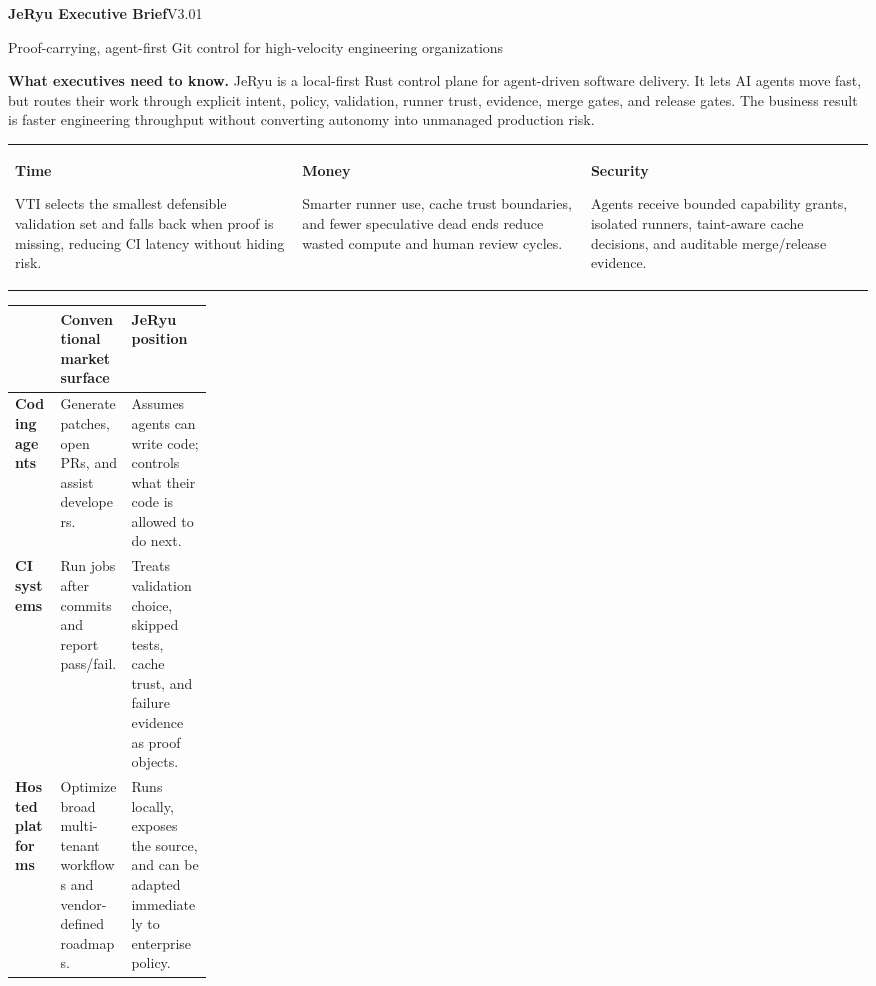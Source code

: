 \documentclass[10pt]{article}
\newcommand{\metricbox}[3]{%
\begin{tcolorbox}[enhanced,sharp corners,boxrule=0.45pt,colframe=#1!70!black,colback=#1!8,left=5pt,right=5pt,top=4pt,bottom=4pt,height=1.05in]
{\footnotesize\bfseries #2}\par
{\scriptsize #3}
\end{tcolorbox}}
\newcommand{\sectionlabel}[1]{\vspace{2pt}{\small\bfseries\color{navy}#1}\vspace{2pt}\par}
\begin{document}
{\LARGE\bfseries JeRyu Executive Brief}\hfill{\small V3.01}

{\large\color{navy}Proof-carrying, agent-first Git control for high-velocity engineering organizations}

\vspace{3pt}
\begin{tcolorbox}[enhanced,sharp corners,boxrule=0pt,colback=navy!7,left=7pt,right=7pt,top=6pt,bottom=6pt]
{\bfseries What executives need to know.}
JeRyu is a local-first Rust control plane for agent-driven software delivery. It lets AI agents move fast, but routes their work through explicit intent, policy, validation, runner trust, evidence, merge gates, and release gates. The business result is faster engineering throughput without converting autonomy into unmanaged production risk.
\end{tcolorbox}

\sectionlabel{Business Value}
\begin{tabularx}{\linewidth}{@{}Y Y Y@{}}
\metricbox{blue}{Time}{VTI selects the smallest defensible validation set and falls back when proof is missing, reducing CI latency without hiding risk.} &
\metricbox{green}{Money}{Smarter runner use, cache trust boundaries, and fewer speculative dead ends reduce wasted compute and human review cycles.} &
\metricbox{gold}{Security}{Agents receive bounded capability grants, isolated runners, taint-aware cache decisions, and auditable merge/release evidence.}
\end{tabularx}

\sectionlabel{Why It Is Different}
\begin{tcolorbox}[enhanced,sharp corners,boxrule=0.45pt,colframe=line,colback=softgray,left=6pt,right=6pt,top=5pt,bottom=5pt]
\small
\begin{tabularx}{\linewidth}{@{}>{\bfseries}p{0.23\linewidth}Y Y@{}}
 & Conventional market surface & JeRyu position\\
\hline
Coding agents & Generate patches, open PRs, and assist developers. & Assumes agents can write code; controls what their code is allowed to do next.\\
CI systems & Run jobs after commits and report pass/fail. & Treats validation choice, skipped tests, cache trust, and failure evidence as proof objects.\\
Hosted platforms & Optimize broad multi-tenant workflows and vendor-defined roadmaps. & Runs locally, exposes the source, and can be adapted immediately to enterprise policy.\\
\end{tabularx}
\end{tcolorbox}
\end{document}
